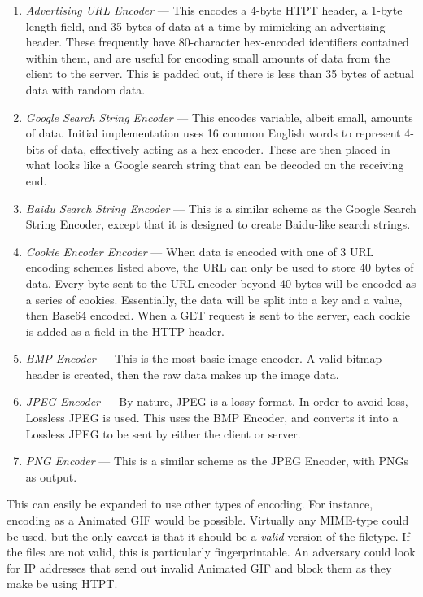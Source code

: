 \begin{enumerate}
  \item \emph{Advertising URL Encoder} --- This encodes a 4-byte HTPT header, a 1-byte length field, and 35 bytes of data  at a time by mimicking an advertising header. These frequently have 80-character hex-encoded identifiers contained within them, and are useful for encoding small amounts of data from the client to the server. This is padded out, if there is less than 35 bytes of actual data with random data.
  \item \emph{Google Search String Encoder} --- This encodes variable, albeit small, amounts of data. Initial implementation uses 16 common English words to represent 4-bits of data, effectively acting as a hex encoder. These are then placed in what looks like a Google search string that can be decoded on the receiving end.
  \item \emph{Baidu Search String Encoder} --- This is a similar scheme as the Google Search String Encoder, except that it is designed to create Baidu-like search strings.
  \item \emph{Cookie Encoder Encoder} --- When data is encoded with one of 3 URL encoding schemes listed above, the URL can only be used to store 40 bytes of data. Every byte sent to the URL encoder beyond 40 bytes will be encoded as a series of cookies. Essentially, the data will be split into a key and a value, then Base64 encoded. When a GET request is sent to the server, each cookie is added as a field in the HTTP header.
  \item \emph{BMP Encoder} --- This is the most basic image encoder. A valid bitmap header is created, then the raw data makes up the image data.
  \item \emph{JPEG Encoder} --- By nature, JPEG is a lossy format. In order to avoid loss, Lossless JPEG is used. This uses the BMP Encoder, and converts it into a Lossless JPEG to be sent by either the client or server.
  \item \emph{PNG Encoder} --- This is a similar scheme as the JPEG Encoder, with PNGs as output.
\end{enumerate}

This can easily be expanded to use other types of encoding. For instance, encoding as a Animated GIF would be possible. Virtually any MIME-type could be used, but the only caveat is that it should be a \emph{valid} version of the filetype. If the files are not valid, this is particularly fingerprintable. An adversary could look for IP addresses that send out invalid Animated GIF and block them as they make be using HTPT.

